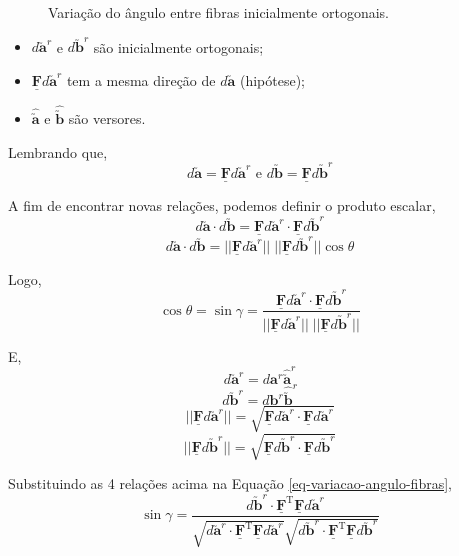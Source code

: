 \begin{figure}[H]
	\centering
	\caption{Variação do ângulo entre fibras inicialmente ortogonais.}
	\vspace*{5mm}
	
\end{figure}

\begin{itemize}
    \item $d\utilde{\mathbf{a}}^r$ e $d\utilde{\mathbf{b}}^r$ são inicialmente ortogonais;
    \item $\underline{\mathbf{F}}d\utilde{\mathbf{a}}^r$ tem a mesma direção de $d\utilde{\mathbf{a}}$ (hipótese);
    \item $\hat{\utilde{\mathbf{a}}}$ e $\hat{\utilde{\mathbf{b}}}$ são versores.
\end{itemize}

Lembrando que,
\[d\utilde{\mathbf{a}}=\underline{\mathbf{F}}d\utilde{\mathbf{a}}^r\text{ e }d\utilde{\mathbf{b}}=\underline{\mathbf{F}}d\utilde{\mathbf{b}}^r\]

A fim de encontrar novas relações, podemos definir o produto escalar,
\[d\utilde{\mathbf{a}}\cdot d\utilde{\mathbf{b}}=\underline{\mathbf{F}}d\utilde{\mathbf{a}}^r\cdot\underline{\mathbf{F}}d\utilde{\mathbf{b}}^r\]
\[d\utilde{\mathbf{a}}\cdot d\utilde{\mathbf{b}}=||\underline{\mathbf{F}}d\utilde{\mathbf{a}}^r||\;|| \underline{\mathbf{F}}d\utilde{\mathbf{b}}^r ||\cos\theta\]

Logo,
\begin{equation}\label{eq-variacao-angulo-fibras}
    \cos\theta=\sin\gamma=\frac{\underline{\mathbf{F}}d\utilde{\mathbf{a}}^r\cdot\underline{\mathbf{F}}d\utilde{\mathbf{b}}^r}{||\underline{\mathbf{F}}d\utilde{\mathbf{a}}^r||\;|| \underline{\mathbf{F}}d\utilde{\mathbf{b}}^r ||}
\end{equation}

E,
\[d\utilde{\mathbf{a}}^r=d\mathbf{a}^r\hat{\utilde{\mathbf{a}}}^r\]
\[d\utilde{\mathbf{b}}^r=d\mathbf{b}^r\hat{\utilde{\mathbf{b}}}^r\]
\[||\underline{\mathbf{F}}d\utilde{\mathbf{a}}^r||=\sqrt{\underline{\mathbf{F}}d\utilde{\mathbf{a}}^r\cdot\underline{\mathbf{F}}d\utilde{\mathbf{a}}^r}\]
\[||\underline{\mathbf{F}}d\utilde{\mathbf{b}}^r||=\sqrt{\underline{\mathbf{F}}d\utilde{\mathbf{b}}^r\cdot\underline{\mathbf{F}}d\utilde{\mathbf{b}}^r}\]

Substituindo as 4 relações acima na Equação \eqref{eq-variacao-angulo-fibras},
\[\sin\gamma=\frac{d\utilde{\mathbf{b}}^r\cdot\underline{\mathbf{F}}^{\text{T}}\underline{\mathbf{F}}d\utilde{\mathbf{a}}^r}{\sqrt{d\utilde{\mathbf{a}}^r\cdot\underline{\mathbf{F}}^{\text{T}}\underline{\mathbf{F}}d\utilde{\mathbf{a}}^r}\sqrt{d\utilde{\mathbf{b}}^r\cdot\underline{\mathbf{F}}^{\text{T}}\underline{\mathbf{F}}d\utilde{\mathbf{b}}^r}}\]

